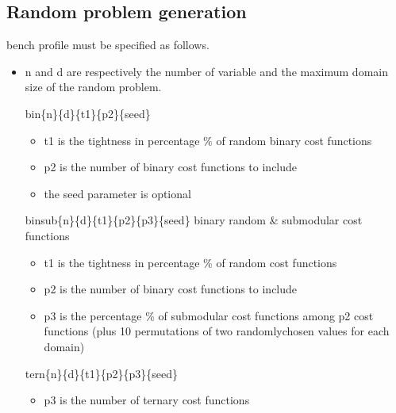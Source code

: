 \documentclass[letterpaper,10pt,openany,oneside,english]{sphinxmanual}
\begin{document}
\subsection{Random problem generation}
\label{\detokenize{userdoc:random-problem-generation}}\begin{description}
\sphinxAtStartPar
bench profile must be specified as follows.
\begin{itemize}
\item {} 
\sphinxAtStartPar
n and d are respectively the number of variable and the
maximum domain size of the random problem.

\sphinxAtStartPar
bin\sphinxhyphen{}\{n\}\sphinxhyphen{}\{d\}\sphinxhyphen{}\{t1\}\sphinxhyphen{}\{p2\}\sphinxhyphen{}\{seed\}
\begin{itemize}
\item {} 
\sphinxAtStartPar
t1 is the tightness in percentage \% of random binary cost
functions

\item {} 
\sphinxAtStartPar
p2 is the number of binary cost functions to include

\item {} 
\sphinxAtStartPar
the seed parameter is optional

\end{itemize}

\sphinxAtStartPar
binsub\sphinxhyphen{}\{n\}\sphinxhyphen{}\{d\}\sphinxhyphen{}\{t1\}\sphinxhyphen{}\{p2\}\sphinxhyphen{}\{p3\}\sphinxhyphen{}\{seed\} binary random \& submodular
cost functions
\begin{itemize}
\item {} 
\sphinxAtStartPar
t1 is the tightness in percentage \% of random cost functions

\item {} 
\sphinxAtStartPar
p2 is the number of binary cost functions to include

\item {} 
\sphinxAtStartPar
p3 is the percentage \% of submodular cost functions among p2
cost functions
(plus 10 permutations of two randomly\sphinxhyphen{}chosen values for each
domain)

\end{itemize}

\sphinxAtStartPar
tern\sphinxhyphen{}\{n\}\sphinxhyphen{}\{d\}\sphinxhyphen{}\{t1\}\sphinxhyphen{}\{p2\}\sphinxhyphen{}\{p3\}\sphinxhyphen{}\{seed\}
\begin{itemize}
\item {} 
\sphinxAtStartPar
p3 is the number of ternary cost functions


\end{itemize}
\end{itemize}
\end{description}
\end{document}
